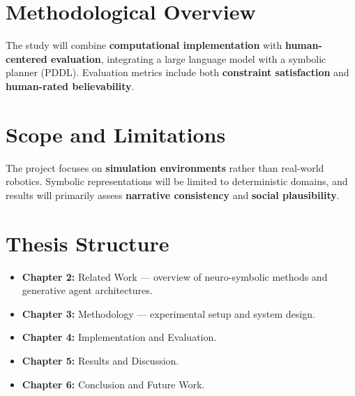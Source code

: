 \section{Methodological Overview}
The study will combine \textbf{computational implementation} with \textbf{human-centered evaluation}, integrating a large language model with a symbolic planner (PDDL). Evaluation metrics include both \textbf{constraint satisfaction} and \textbf{human-rated believability}.

\section{Scope and Limitations}
The project focuses on \textbf{simulation environments} rather than real-world robotics. Symbolic representations will be limited to deterministic domains, and results will primarily assess \textbf{narrative consistency} and \textbf{social plausibility}.

\section{Thesis Structure}
\begin{itemize}
\item \textbf{Chapter 2:} Related Work — overview of neuro-symbolic methods and generative agent architectures.  
\item \textbf{Chapter 3:} Methodology — experimental setup and system design.  
\item \textbf{Chapter 4:} Implementation and Evaluation.  
\item \textbf{Chapter 5:} Results and Discussion.  
\item \textbf{Chapter 6:} Conclusion and Future Work.
\end{itemize}
